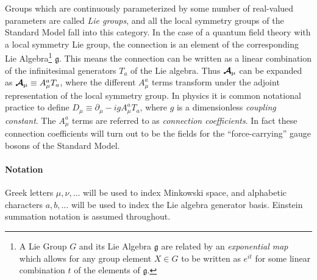 
Groups which are continuously parameterized by some number of real-valued parameters are called \textit{Lie groups}, and all the local symmetry groups of the Standard Model fall into this category.
In the case of a quantum field theory with a local symmetry Lie group, the connection is an element of the corresponding Lie Algebra\footnote{A Lie Group $G$ and its Lie Algebra $\mathfrak{g}$ are related by an \textit{exponential map} which allows for any group element $X \in G$ to be written as $e^{it}$ for some linear combination $t$ of the elements of $\mathfrak{g}$.} $\mathfrak{g}$.
This means the connection can be written as a linear combination of the infinitesimal generators $T_a$ of the Lie algebra.
Thus $ \boldsymbol{\mathcal{A}} _\mu$ can be expanded as $ \boldsymbol{\mathcal{A}} _\mu \equiv A_\mu^a T_a$, where the different $A_\mu^a$ terms transform under the adjoint representation of the local symmetry group.
In physics it is common notational practice to define $D_\mu \equiv \partial_\mu - igA_\mu^aT_a$, where $g$ is a dimensionless \textit{coupling constant}.
The $A_\mu^a$ terms are referred to as \textit{connection coefficients}.
In fact these connection coefficients will turn out to be the fields for the ``force-carrying'' gauge bosons of the Standard Model.

\begin{tcolorbox}
\paragraph{Notation} Greek letters $\mu,\nu,\dots$ will be used to index Minkowski space, and alphabetic characters $a,b,\dots$ will be used to index the Lie algebra generator basis.
Einstein summation notation is assumed throughout.
\end{tcolorbox}

